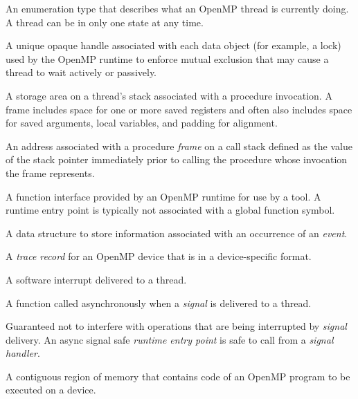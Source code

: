 \glossarydefstart
An enumeration type that describes what an OpenMP thread is currently doing.
A thread can be in only one state at any time.
\glossarydefend

\glossarydefstart
A unique opaque handle associated with each data object (for example, a lock) used by the OpenMP runtime
to enforce mutual exclusion that may cause a thread to wait actively or passively.
\glossarydefend

\glossarydefstart
A storage area on a thread's stack associated with a procedure invocation. A frame includes space for
one or more saved registers and often also includes space for saved arguments, local variables,
and padding for alignment.
\glossarydefend

\glossarydefstart
An address associated with a procedure \emph{frame} on a call stack defined as the value of the stack pointer immediately prior
to calling the procedure whose invocation the frame represents.
\glossarydefend

\glossarydefstart
A function interface provided by an OpenMP runtime for use by a tool. A runtime entry point is
typically not associated with a global function symbol.
\glossarydefend

\glossarydefstart
A data structure to store information associated with an occurrence of an \emph{event}.
\glossarydefend

\glossarydefstart
A \emph{trace record} for an OpenMP device that is in a device-specific format.
\glossarydefend

\glossarydefstart
A software interrupt delivered to a thread.
\glossarydefend

\glossarydefstart
A function called asynchronously when a \emph{signal} is delivered to a thread.
\glossarydefend

\glossarydefstart
Guaranteed not to interfere with operations that are being interrupted by \emph{signal} delivery.
An async signal safe \emph{runtime entry point} is safe to call from a \emph{signal handler}.
\glossarydefend

\glossarydefstart
A contiguous region of memory that contains code of an OpenMP program to be executed on a device.
\glossarydefend


